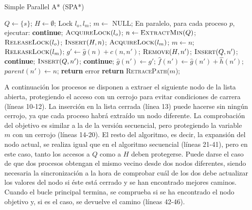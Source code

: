 \documentclass[a4paper,12pt]{article}
\begin{document}
\begin{algorithm}[H]
\begin{algorithmic}[1]
\small
\caption{Simple Parallel A* (SPA*)}\label{spastar}
\State $Q \gets \{s\}$;
\State $H \gets \emptyset$;
\State Lock $l_o, l_m$;
\State $m \gets$ NULL;
\State En paralelo, para cada proceso $p$, ejecutar:
        \State \textbf{continue};
    \EndIf
    \State $\textsc{AcquireLock}(l_o)$;
    \State $n \gets \textsc{ExtractMin}(Q)$;
    \State $\textsc{ReleaseLock}(l_o)$;
    \State $\textsc{Insert}(H, n)$;
        \State $\textsc{AcquireLock}(l_m)$;
            \State $m \gets n$;
        \EndIf
        \State $\textsc{ReleaseLock}(l_m)$;
    \EndIf
        \State $g' \gets \hat{g}(n)+c(n, n')$;
                \State $\textsc{Remove}(H,n')$;
                \State $\textsc{Insert}(Q, n')$;
            \Else
                \State \textbf{continue};
            \EndIf
        \Else
                \State $\textsc{Insert}(Q,n')$;
                \State \textbf{continue};
            \EndIf
        \EndIf
        \State $\hat{g}(n') \gets g'$;
        \State $\hat{f}(n') \gets \hat{g}(n') + \hat{h}(n')$;
        \State $parent(n') \gets n$;
    \EndFor
\EndWhile
{}
    \State \textbf{return} error
\Else
    \State \textbf{return} \textsc{RetracePath}($m$);
\EndIf
\end{algorithmic}
\end{algorithm}

A continuación los procesos se disponen a extraer el siguiente nodo de la lista abierta, protegiendo el acceso con un cerrojo para evitar condiciones de carrera (líneas 10-12). La inserción en la lista cerrada (línea 13) puede hacerse sin ningún cerrojo, ya que cada proceso habrá extraído un nodo diferente. La comprobación del objetivo es similar a la de la versión secuencial, pero protegiendo la variable $m$ con un cerrojo (líneas 14-20). El resto del algoritmo, es decir, la expansión del nodo actual, se realiza igual que en el algoritmo secuencial (líneas 21-41), pero en este caso, tanto los accesos a $Q$ como a $H$ deben protegerse. Puede darse el caso de que dos procesos obtengan el mismo vecino desde dos nodos diferentes, siendo necesaria la sincronización a la hora de comprobar cuál de los dos debe actualizar los valores del nodo si éste está cerrado y se han encontrado mejores caminos. Cuando el bucle principal termina, se comprueba si se ha encontrado el nodo objetivo y, si es el caso, se devuelve el camino (líneas 42-46).
\end{document}
